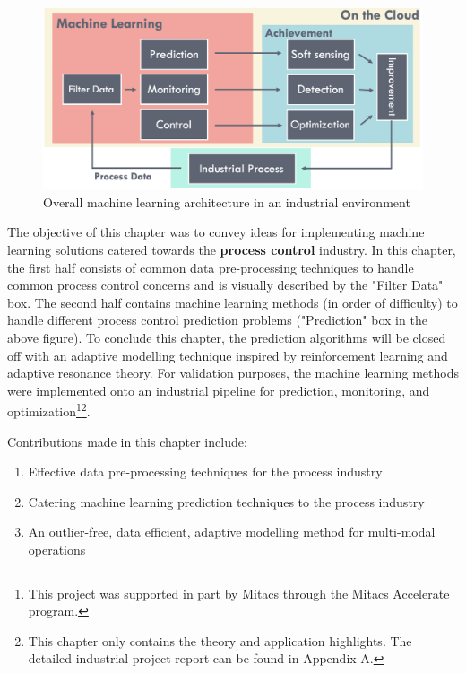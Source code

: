 \begin{figure}[h]
    \centering
    \includegraphics[width=\textwidth]{images/ch2/02AICloud.png}
    \caption{Overall machine learning architecture in an industrial environment}
    \label{fig:02AICloud}
\end{figure}

The objective of this chapter was to convey ideas for implementing machine learning solutions catered towards the \textbf{process control} industry.  In this chapter, the first half consists of common data pre-processing techniques to handle common process control concerns and is visually described by the "Filter Data" box.  The second half contains machine learning methods (in order of difficulty) to handle different process control prediction problems ("Prediction" box in the above figure). To conclude this chapter, the prediction algorithms will be closed off with an adaptive modelling technique inspired by reinforcement learning and adaptive resonance theory. For validation purposes, the machine learning methods were implemented onto an industrial pipeline for prediction, monitoring, and optimization\footnote{This project was supported in part by Mitacs through the Mitacs Accelerate program.}\footnote{This chapter only contains the theory and application highlights. The detailed industrial project report can be found in Appendix A.}.

Contributions made in this chapter include:
\begin{enumerate}
    \item Effective data pre-processing techniques for the process industry
    \item Catering machine learning prediction techniques to the process industry
    \item An outlier-free, data efficient, adaptive modelling method for multi-modal operations
\end{enumerate}

